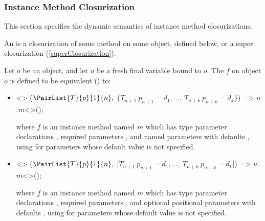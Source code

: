\documentclass[makeidx]{article}
\begin{document}
{


\subsubsection{Instance Method Closurization}

\LMHash{}%
This section specifies the dynamic semantics of instance method closurizations.


\LMHash{}%
An 
is a closurization of some method on some object, defined below,
or a super closurization (\ref{superClosurization}).

\LMHash{}%
Let $o$ be an object, and let $u$ be a fresh final variable bound to $o$.
The  $f$ on object $o$
is defined to be equivalent
() to:
\begin{itemize}
\item
\begin{normativeDartCode}
<>
($\PairList{T}{p}{1}{n},\ $\{$T_{n+1}\ p_{n+1} = d_1, \ldots,\ T_{n+k}\ p_{n+k} = d_k$\}) =>
\quad$u$.$m$<>();
\end{normativeDartCode}
where $f$ is an instance method named $m$
which has type parameter declarations
\TypeParametersStd,
required parameters ,
and named parameters  with defaults ,
using  for parameters whose default value is not specified.
\item
\begin{normativeDartCode}
<>
($\PairList{T}{p}{1}{n},\ $[$T_{n+1}\ p_{n+1} = d_1, \ldots,\ T_{n+k}\ p_{n+k} = d_k$]) =>
\quad$u$.$m$<>();
\end{normativeDartCode}
where $f$ is an instance method named $m$
which has type parameter declarations
\TypeParametersStd,
required parameters ,
and optional positional parameters
 with defaults ,
using  for parameters whose default value is not specified.
\end{itemize}

}
\end{document}
